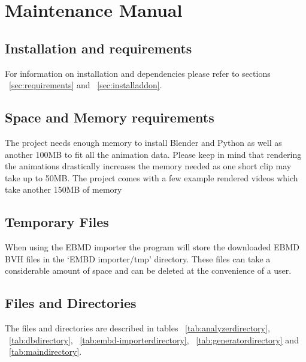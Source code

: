 \chapter{Maintenance Manual \label{chap:maintenance}}

\section{Installation and requirements}
For information on installation and dependencies please refer to sections ~\ref{sec:requirements} and ~\ref{sec:installaddon}.

\section{Space and Memory requirements}
The project needs enough memory to install Blender and Python as well as another 100MB to fit all the animation data. Please keep in mind that rendering the animations drastically increases the memory needed as one short clip may take up to 50MB. The project comes with a few example rendered videos which take another 150MB of memory

\section{Temporary Files}
When using the EBMD importer the program will store the downloaded EBMD BVH files in the `EMBD importer/tmp' directory. These files can take a considerable amount of space and can be deleted at the convenience of a user.

\section{Files and Directories}
The files and directories are described in tables ~\ref{tab:analyzerdirectory}, ~\ref{tab:dbdirectory}, ~\ref{tab:embd-importerdirectory}, ~\ref{tab:generatordirectory} and ~\ref{tab:maindirectory}.

